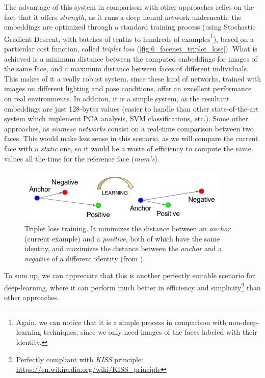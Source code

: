 		The advantage of this system in comparison with other approaches relies on the fact that it offers \emph{strength}, as it runs a deep neural network underneath: the embeddings are optimized through a standard training process (using Stochastic Gradient Descent, with batches of tenths to hundreds of examples\footnote{Again, we can notice that it is a simple process in comparison with non-deep-learning techniques, since we only need images of the faces labeled with their identity.}), based on a particular cost function, called \emph{triplet loss} (\autoref{fig:6_facenet_triplet_loss}). What is achieved is a minimum distance between the computed embeddings for images of the same face, and a maximum distance between faces of different individuals. This makes of it a really robust system, since these kind of networks, trained with images on different lighting and pose conditions, offer an excellent performance on real environments. In addition, it is a simple system, as the resultant embeddings are just 128-bytes values (easier to handle than other state-of-the-art system which implement PCA analysis, SVM classifications, etc.). Some other approaches, as \emph{siamese networks} consist on a real-time comparison between two faces. This would make less sense in this scenario, as we will compare the current face with a \emph{static} one, so it would be a waste of efficiency to compute the same values all the time for the reference face (\emph{mom's}).\\

		
		\begin{figure}[h]
			\centering
			\includegraphics[width=4in]{images/facenet_triplet_loss}
			\caption{Triplet loss training. It minimizes the distance between an \emph{anchor} (current example) and a \emph{positive}, both of which have the same identity, and maximizes the distance between the \emph{anchor} and a \emph{negative} of a different identity (from \cite{facenet}).}
			\label{fig:6_facenet_triplet_loss}
		\end{figure}
		To sum up, we can appreciate that this is another perfectly suitable scenario for deep-learning, where it can perform much better in efficiency and simplicity\footnote{Perfectly compliant with \emph{KISS} principle: \url{https://en.wikipedia.org/wiki/KISS\_principle}} than other approaches.\\
		
